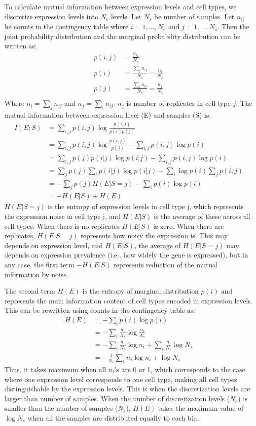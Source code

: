 To calculate mutual information between expression levels and cell types, we discretize expression levels into $N_{e}$ levels. Let $N_{s}$ be number of samples. Let $n_{ij}$ be counts in the contingency table where $i=1,...,N_{e}$ and $j=1,...,N_{s}$. Then the joint probability distribution and the marginal probability distribution can be written as:
\begin{align}
p(i,j) &= \frac{n_{ij}}{N_{s}} \\
p(i) &= \frac{\sum_{j}{n_{ij}}}{N_{s}} = \frac{n_i}{N_s} \\
p(j) &= \frac{\sum_{i}{n_{ij}}}{N_{s}} = \frac{n_j}{N_s}\\
\end{align}
Where $n_i = \sum_{j}{n_{ij}}$ and $n_j=\sum_{i}n_{ij}$. $n_j$ is number of replicates in cell type $j$. The mutual information between expression level (E) and samples (S) is:
\begin{align}
I(E;S) &= \sum_{i,j}{p(i,j)\log\frac{p(i,j)}{p(i)p(j)}} \\
       &= \sum_{i,j}{p(i,j)\log\frac{p(i,j)}{p(j)}}-\sum_{i,j}p(i,j)\log{p(i)}  \\
       &= \sum_{i,j}p(j)p(i|j)\log{p(i|j)}-\sum_{i,j}p(i,j)\log{p(i)}  \\
       &= \sum_{j}p(j)\sum_{i}p(i|j)\log{p(i|j)}-\sum_{i}\log{p(i)}\sum_{j}p(i,j)  \\
       &= -\sum_{j}p(j)H(E|S=j)-\sum_{i}p(i)\log{p(i)}  \\
       &= -H(E|S)+H(E)
\end{align}
$H(E|S=j)$ is the entropy of expression levels in cell type j, which represents the expression noise in cell type j, and $H(E|S)$ is the average of these across all cell types. When there is no replicates $H(E|S)$ is zero. When there are replicates, $H(E|S=j)$ represents how noisy the expression is. This may depends on expression level, and $H(E|S)$, the average of $H(E|S=j)$ may depends on expression prevalence (i.e., how widely the gene is expressed), but in any case, the first term $-H(E|S)$ represents reduction of the mutual information by noise. 

The second term $H(E)$ is the entropy of marginal distribution $p(i)$ and represents the main information content of cell types encoded in expression levels. This can be rewritten using counts in the contingency table as:
\begin{align}
H(E) &= -\sum_{i}p(i)\log p(i) \\
     &= -\sum_{i}\frac{n_i}{N_s} \log \frac{n_i}{N_s} \\
     &= -\sum_{i}\frac{n_i}{N_s} \log n_i + \sum_{i}\frac{n_i}{N_s}\log N_s \\
     &= - \frac{1}{N_s}\sum_{i}n_i\log n_i + \log N_s
\end{align}
Thus, it takes maximum when all $n_i$'s are 0 or 1, which corresponds to the case where one expression level corresponds to one cell type, making all cell types distinguishable by the expression levels. This is when the discretization levels are larger than number of samples. When the number of discretization levels ($N_e$) is smaller than the number of samples ($N_s$), $H(E)$ takes the maximum value of $\log N_e$ when all the samples are distributed equally to each bin.

